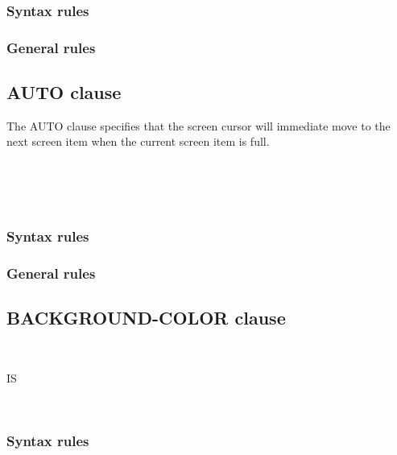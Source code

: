 \subsubsection{Syntax rules}

\subsubsection{General rules}

\subsection{AUTO clause}

The AUTO clause specifies that the screen cursor will immediate move to the next screen item when the current screen item is full.

\begin{syntax}
  \begin{1=}
     \\
     \\
     \\
  \end{1=}
\end{syntax}

\subsubsection{Syntax rules}

\subsubsection{General rules}

\subsection{BACKGROUND-COLOR clause}

\begin{syntax}
  \begin{1=}
     \\
  \end{1=}
  IS
  \begin{1=}
    \identifier \\
    \literal
  \end{1=}
\end{syntax}

\subsubsection{Syntax rules}

